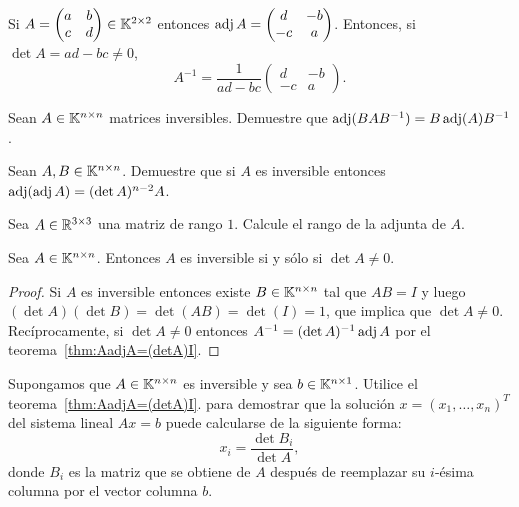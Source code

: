 \begin{example}
	Si $A=\begin{pmatrix}a&b\\c&d\end{pmatrix}\in\mathbb{K}^{2\times2}$ entonces 
	$\operatorname{adj} A=\begin{pmatrix}d&-b\\-c&a\end{pmatrix}$. Entonces, si $\det
	A=ad-bc\ne0$, 
	\[
		A^{-1}=\frac{1}{ad-bc}\begin{pmatrix}d&-b\\-c&a\end{pmatrix}.
	\]
\end{example}

\begin{xca}
	\label{xca:adjadjA}
	Sean $A\in\mathbb{K}^{n\times n}$ matrices inversibles. Demuestre que 
	$\operatorname{adj}(BAB^{-1})=B\operatorname{adj}(A)B^{-1}$. 
\end{xca}

\begin{xca}
	\label{xca:adj(BAB^(-1))}
    Sean $A,B\in\mathbb{K}^{n\times n}$. Demuestre que si $A$ es inversible entonces
    $\operatorname{adj}(\operatorname{adj} A)=(\det A)^{n-2}A$.
\end{xca}

\begin{xca}
    Sea $A\in\mathbb{R}^{3\times3}$ una matriz de rango $1$. Calcule el rango de la
    adjunta de $A$.
\end{xca}

\begin{cor}
	\label{cor:no_inversible<=>detA=0}
    Sea $A\in\mathbb{K}^{n\times n}$. Entonces $A$ es inversible si y sólo si $\det
    A\ne0$. 

    \begin{proof}
        Si $A$ es inversible entonces existe $B\in\mathbb{K}^{n\times n}$ tal que
        $AB=I$ y luego $(\det A)(\det B)=\det(AB)=\det(I)=1$, que implica que
        $\det A\ne0$.  Recíprocamente, si $\det A\ne0$ entonces $A^{-1}=(\det
        A)^{-1}\operatorname{adj} A$ por el teorema~\ref{thm:AadjA=(detA)I}.
    \end{proof}
\end{cor}

\begin{xca}
	\label{block:Cramer}
	Supongamos que $A\in\mathbb{K}^{n\times n}$ es inversible y sea
    $b\in\mathbb{K}^{n\times1}$. Utilice el 
    teorema~\ref{thm:AadjA=(detA)I}.
    para demostrar que la solución $x=(x_1,\dots,x_n)^T$ del sistema lineal
    $Ax=b$ puede calcularse de la siguiente forma: 
    \[
    x_i=\frac{\det B_i}{\det A},
    \]
	donde $B_i$ es la matriz que se obtiene de $A$ después de reemplazar su
	$i$-ésima columna por el vector columna $b$. 
\end{xca}

